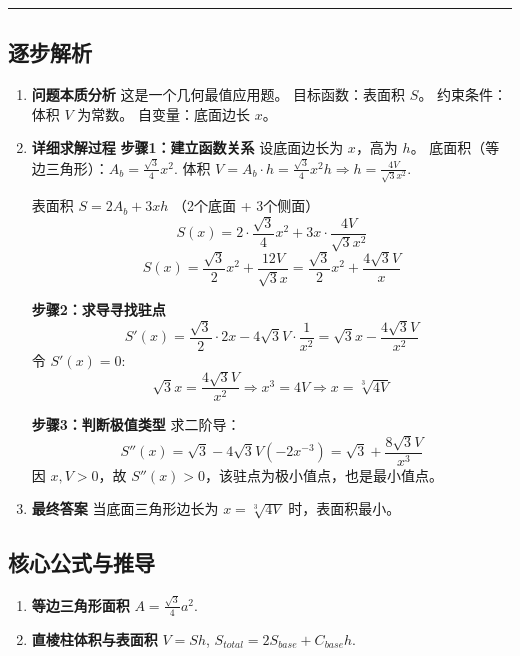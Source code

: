 \documentclass[12pt, a4paper]{article}
\newenvironment{redenv}{\color{red}}{}
\newenvironment{detailedanalysis}{%
    \color{red}
    \begin{enumerate}[label=\textbf{第\arabic*步：}, leftmargin=*, align=left, itemsep=1.5ex]
}{%
    \end{enumerate}
}
\newenvironment{formuladerivation}{%
    \begin{enumerate}[label={\textbf{公式\arabic*：}}, leftmargin=*, align=left]
}{%
    \end{enumerate}
}
\newcommand{\analysisrule}{\noindent\rule{\textwidth}{0.8pt}\vspace{-0.8em}}
\begin{document}
\begin{redenv}
\analysisrule
\subsection*{逐步解析}

\begin{detailedanalysis}
\item \textbf{问题本质分析}
这是一个几何最值应用题。
目标函数：表面积 $S$。
约束条件：体积 $V$ 为常数。
自变量：底面边长 $x$。

\item \textbf{详细求解过程}
\textbf{步骤1：建立函数关系}
设底面边长为 $x$，高为 $h$。
底面积（等边三角形）：$A_b = \frac{\sqrt{3}}{4}x^2$.
体积 $V = A_b \cdot h = \frac{\sqrt{3}}{4}x^2 h \Rightarrow h = \frac{4V}{\sqrt{3}x^2}$.

表面积 $S = 2A_b + 3xh$ （2个底面 + 3个侧面）
\[ S(x) = 2 \cdot \frac{\sqrt{3}}{4}x^2 + 3x \cdot \frac{4V}{\sqrt{3}x^2} \]
\[ S(x) = \frac{\sqrt{3}}{2}x^2 + \frac{12V}{\sqrt{3}x} = \frac{\sqrt{3}}{2}x^2 + \frac{4\sqrt{3}V}{x} \]

\textbf{步骤2：求导寻找驻点}
\[ S'(x) = \frac{\sqrt{3}}{2} \cdot 2x - 4\sqrt{3}V \cdot \frac{1}{x^2} = \sqrt{3}x - \frac{4\sqrt{3}V}{x^2} \]
令 $S'(x) = 0$:
\[ \sqrt{3}x = \frac{4\sqrt{3}V}{x^2} \Rightarrow x^3 = 4V \Rightarrow x = \sqrt[3]{4V} \]

\textbf{步骤3：判断极值类型}
求二阶导：
\[ S''(x) = \sqrt{3} - 4\sqrt{3}V (-2x^{-3}) = \sqrt{3} + \frac{8\sqrt{3}V}{x^3} \]
因 $x, V > 0$，故 $S''(x) > 0$，该驻点为极小值点，也是最小值点。

\item \textbf{最终答案}
当底面三角形边长为 $x = \sqrt[3]{4V}$ 时，表面积最小。
\end{detailedanalysis}

\subsection*{核心公式与推导}
\begin{formuladerivation}
\item \textbf{等边三角形面积}
$A = \frac{\sqrt{3}}{4}a^2$.
\item \textbf{直棱柱体积与表面积}
$V = Sh$, $S_{total} = 2S_{base} + C_{base}h$.
\end{formuladerivation}
\end{redenv}
\end{document}
